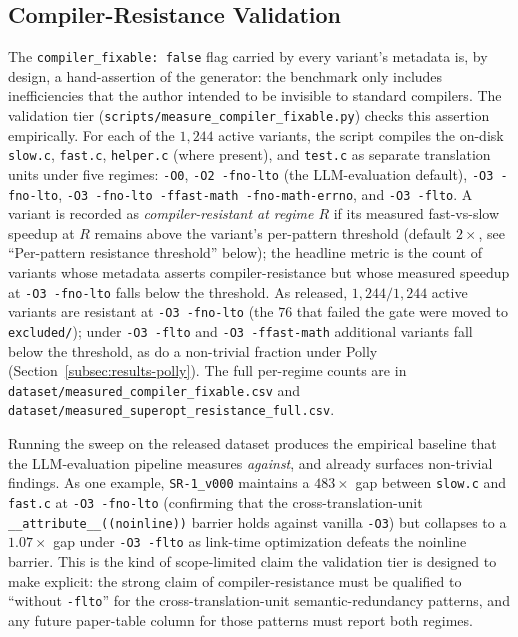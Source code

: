 \subsection{Compiler-Resistance Validation}\label{subsec:compiler-resistance}

The \texttt{compiler\_fixable: false} flag carried by every variant's metadata is, by design, a hand-assertion of the generator: the benchmark only includes inefficiencies that the author intended to be invisible to standard compilers. The validation tier (\texttt{scripts/measure\_compiler\_fixable.py}) checks this assertion empirically. For each of the $1{,}244$ active variants, the script compiles the on-disk \texttt{slow.c}, \texttt{fast.c}, \texttt{helper.c} (where present), and \texttt{test.c} as separate translation units under five regimes: \texttt{-O0}, \texttt{-O2 -fno-lto} (the LLM-evaluation default), \texttt{-O3 -fno-lto}, \texttt{-O3 -fno-lto -ffast-math -fno-math-errno}, and \texttt{-O3 -flto}. A variant is recorded as \emph{compiler-resistant at regime $R$} if its measured fast-vs-slow speedup at $R$ remains above the variant's per-pattern threshold (default $2\times$, see ``Per-pattern resistance threshold'' below); the headline metric is the count of variants whose metadata asserts compiler-resistance but whose measured speedup at \texttt{-O3 -fno-lto} falls below the threshold. As released, $1{,}244/1{,}244$ active variants are resistant at \texttt{-O3 -fno-lto} (the $76$ that failed the gate were moved to \texttt{excluded/}); under \texttt{-O3 -flto} and \texttt{-O3 -ffast-math} additional variants fall below the threshold, as do a non-trivial fraction under Polly (Section~\ref{subsec:results-polly}). The full per-regime counts are in \texttt{dataset/measured\_compiler\_fixable.csv} and \texttt{dataset/measured\_superopt\_resistance\_full.csv}.

Running the sweep on the released dataset produces the empirical baseline that the LLM-evaluation pipeline measures \emph{against}, and already surfaces non-trivial findings. As one example, \texttt{SR-1\_v000} maintains a $483\times$ gap between \texttt{slow.c} and \texttt{fast.c} at \texttt{-O3 -fno-lto} (confirming that the cross-translation-unit \texttt{\_\_attribute\_\_((noinline))} barrier holds against vanilla \texttt{-O3}) but collapses to a $1.07\times$ gap under \texttt{-O3 -flto} as link-time optimization defeats the noinline barrier. This is the kind of scope-limited claim the validation tier is designed to make explicit: the strong claim of compiler-resistance must be qualified to ``without \texttt{-flto}'' for the cross-translation-unit semantic-redundancy patterns, and any future paper-table column for those patterns must report both regimes.

